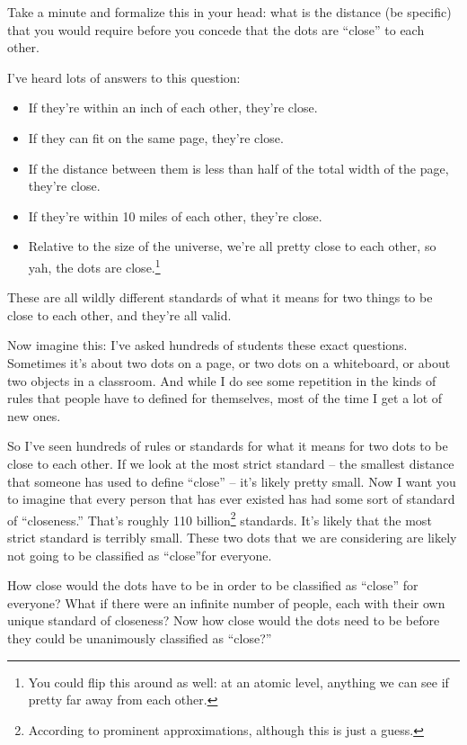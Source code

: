 Take a minute and formalize this in your head: what is the distance (be specific) that you would require before you concede that the dots are ``close'' to each other.

I've heard lots of answers to this question:
\begin{itemize}
  \item If they're within an inch of each other, they're close.
  \item If they can fit on the same page, they're close.
  \item If the distance between them is less than half of the total width of the page, they're close.
  \item If they're within 10 miles of each other, they're close.
  \item Relative to the size of the universe, we're all pretty close to each other, so yah, the dots are close.\footnote{
    You could flip this around as well: at an atomic level, anything we can see if pretty far away from each other.
  }
\end{itemize}

These are all wildly different standards of what it means for two things to be close to each other, and they're all valid.

Now imagine this: I've asked hundreds of students these exact questions. Sometimes it's about two dots on a page, or two dots on a whiteboard, or about two objects in a classroom. And while I do see some repetition in the kinds of rules that people have to defined for themselves, most of the time I get a lot of new ones.

So I've seen hundreds of rules or standards for what it means for two dots to be close to each other. If we look at the most strict standard -- the smallest distance that someone has used to define ``close'' -- it's likely pretty small. Now I want you to imagine that every person that has ever existed has had some sort of standard of ``closeness.'' That's roughly 110 billion\footnote{
  According to prominent approximations, although this is just a guess.
}
standards. It's likely that the most strict standard is terribly small. These two dots that we are considering are likely not going to be classified as ``close''for everyone.

How close would the dots have to be in order to be classified as ``close'' for everyone? What if there were an infinite number of people, each with their own unique standard of closeness? Now how close would the dots need to be before they could be unanimously classified as ``close?''

